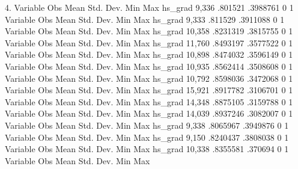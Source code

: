   4. {\rbr}
{\smallskip}
    Variable {\VBAR}        Obs        Mean    Std. Dev.       Min        Max
     hs_grad {\VBAR}      9,336     .801521    .3988761          0          1
{\smallskip}
    Variable {\VBAR}        Obs        Mean    Std. Dev.       Min        Max
     hs_grad {\VBAR}      9,333     .811529    .3911088          0          1
{\smallskip}
    Variable {\VBAR}        Obs        Mean    Std. Dev.       Min        Max
     hs_grad {\VBAR}     10,358    .8231319    .3815755          0          1
{\smallskip}
    Variable {\VBAR}        Obs        Mean    Std. Dev.       Min        Max
     hs_grad {\VBAR}     11,760    .8493197    .3577522          0          1
{\smallskip}
    Variable {\VBAR}        Obs        Mean    Std. Dev.       Min        Max
     hs_grad {\VBAR}     10,898    .8474032    .3596149          0          1
{\smallskip}
    Variable {\VBAR}        Obs        Mean    Std. Dev.       Min        Max
     hs_grad {\VBAR}     10,935    .8562414    .3508608          0          1
{\smallskip}
    Variable {\VBAR}        Obs        Mean    Std. Dev.       Min        Max
     hs_grad {\VBAR}     10,792    .8598036    .3472068          0          1
{\smallskip}
    Variable {\VBAR}        Obs        Mean    Std. Dev.       Min        Max
     hs_grad {\VBAR}     15,921    .8917782    .3106701          0          1
{\smallskip}
    Variable {\VBAR}        Obs        Mean    Std. Dev.       Min        Max
     hs_grad {\VBAR}     14,348    .8875105    .3159788          0          1
{\smallskip}
    Variable {\VBAR}        Obs        Mean    Std. Dev.       Min        Max
     hs_grad {\VBAR}     14,039    .8937246    .3082007          0          1
{\smallskip}
    Variable {\VBAR}        Obs        Mean    Std. Dev.       Min        Max
     hs_grad {\VBAR}      9,338    .8065967    .3949876          0          1
{\smallskip}
    Variable {\VBAR}        Obs        Mean    Std. Dev.       Min        Max
     hs_grad {\VBAR}      9,150    .8240437    .3808038          0          1
{\smallskip}
    Variable {\VBAR}        Obs        Mean    Std. Dev.       Min        Max
     hs_grad {\VBAR}     10,338    .8355581     .370694          0          1
{\smallskip}
    Variable {\VBAR}        Obs        Mean    Std. Dev.       Min        Max
